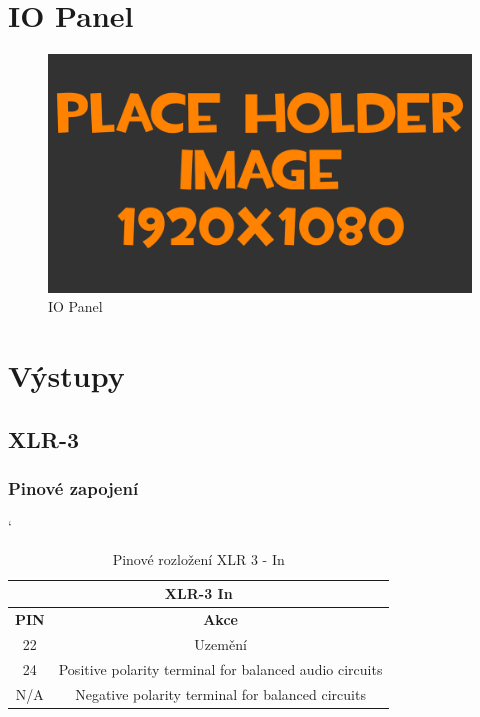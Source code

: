 
\section{IO Panel}
\begin{figure}[h!]
	\centering
	\includegraphics[width=\textwidth]{pictures/placeHolderFHD.png}
    	\caption{IO Panel}
   	\label{fig:panelIO}
\end{figure}

\section{Výstupy}
\subsection{XLR-3}
\subsubsection*{Pinové zapojení}
\begin{table} [h!]
	\centering
	\catcode` %
	\begin{tabular}[c]{|| c | c ||}
	\hline
		\multicolumn{2}{||c||}{XLR-3 In} \\
	\hline
 		 \textbf{PIN} & \textbf{Akce}\\
	\hline
		22 &  Uzemění\\
	\hline
		24 & Positive polarity terminal for balanced audio circuits \\
	\hline
		N/A & Negative polarity terminal for balanced circuits \\
	\hline
	\end{tabular}
	\caption{Pinové rozložení XLR 3 - In}
	\label{table:pinXLR-IN}
\end{table}

